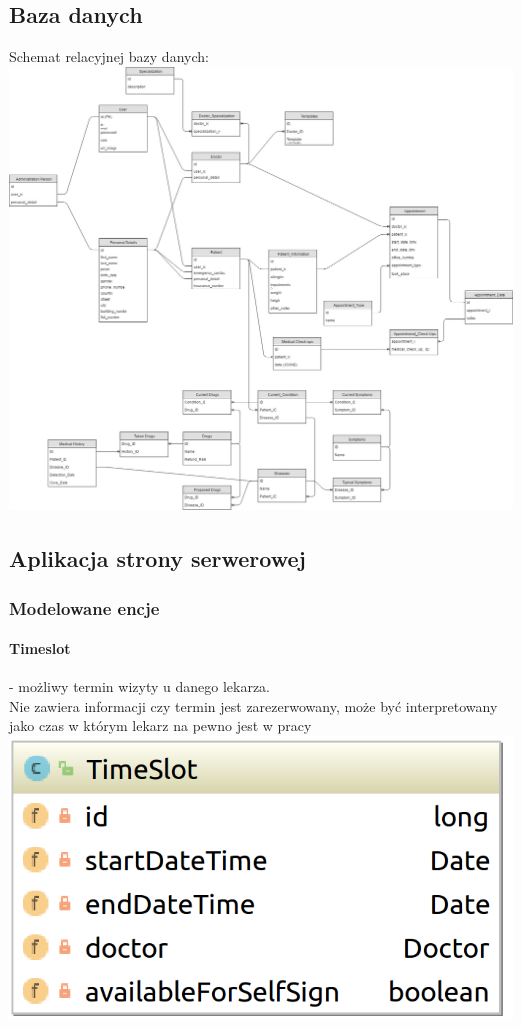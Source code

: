 \documentclass[polish,12pt]{aghthesis}
\begin{document}
\subsection{Baza danych}
Schemat relacyjnej bazy danych:
\includegraphics[width=\textwidth]{db-schema}

\subsection{Aplikacja strony serwerowej}
\subsubsection{Modelowane encje}
    \paragraph{Timeslot} - możliwy termin wizyty u danego lekarza.\\
    Nie zawiera informacji czy termin jest zarezerwowany, może być interpretowany jako czas w którym lekarz na pewno jest w pracy \\
    \includegraphics[width=\textwidth]{TimeSlot}
\end{document}
